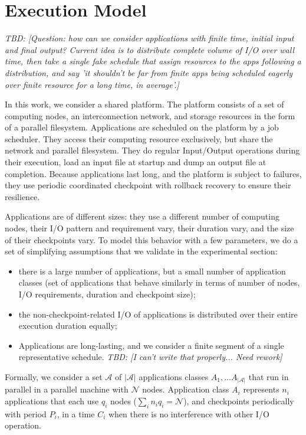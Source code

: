 \documentclass{article}
\newcommand{\appset}{{\mathcal A}}
\newcommand{\nbnodesplat}{{\mathcal N}}
\newcommand{\nbapps}{|{\mathcal A}|}
\newcommand{\app}[1]{A_{#1}}
\newcommand{\nbapp}[1]{n_{#1}}
\newcommand{\nbnodes}[1]{q_{#1}}
\newcommand{\period}[1]{P_{#1}}
\newcommand{\ckpt}[1]{C_{#1}}
\newcommand{\todo}[1]{\textit{TBD: [#1]}}
\begin{document}
\section{Execution Model}
\label{sec.model}

\todo{Question: how can we consider applications with finite time, initial
  input and final output? Current idea is to distribute complete
  volume of I/O over wall time, then take a single fake schedule that
  assign resources to the apps following a distribution, and say 'it
  shouldn't be far from finite apps being scheduled eagerly over
  finite resource for a long time, in average'.}

In this work, we consider a shared platform. The platform consists of
a set of computing nodes, an interconnection network, and storage
resources in the form of a parallel filesystem. Applications are
scheduled on the platform by a job scheduler. They access their
computing resource exclusively, but share the network and parallel
filesystem. They do regular Input/Output operations during their
execution, load an input file at startup and dump an output file at
completion. Because applications last long, and the platform is
subject to failures, they use periodic coordinated checkpoint with
rollback recovery to ensure their resilience.

Applications are of different sizes: they use a different number of
computing nodes, their I/O pattern and requirement vary, their
duration vary, and the size of their checkpoints vary. To model this
behavior with a few parameters, we do a set of simplifying assumptions
that we validate in the experimental section:
\begin{itemize}
  \item there is a large number of applications, but a small number of
    application classes (set of applications that behave similarly in
    terms of number of nodes, I/O requirements, duration and
    checkpoint size);
  \item the non-checkpoint-related I/O of applications is distributed
    over their entire execution duration equally;
  \item Applications are long-lasting, and we consider a finite
    segment of a single representative schedule.
    \todo{I can't write that properly... Need rework}
\end{itemize}

Formally, we consider a set $\appset$ of $\nbapps$ applications
classes $\app{1}, \ldots \app{\nbapps}$ that run in parallel in a
parallel machine with $\nbnodesplat$ nodes. Application class
$\app{i}$ represents $\nbapp{i}$ applications that each use
$\nbnodes{i}$ nodes
($\sum_{i}\nbapp{i} \nbnodes{i} = \nbnodesplat$), and checkpoints
periodically with period $\period{i}$, in a time $\ckpt{i}$ when there
is no interference with other I/O operation.
\end{document}
